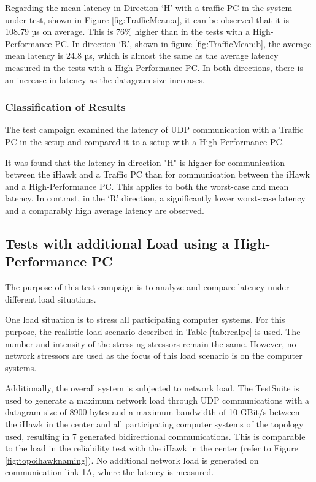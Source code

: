 Regarding the mean latency in Direction `H' with a traffic PC in the system under test, shown in Figure \ref{fig:TrafficMean:a}, it can be observed that it is 108.79 µs on average. This is 76\% higher than in the tests with a High-Performance PC. In direction `R', shown in figure \ref{fig:TrafficMean:b}, the average mean latency is 24.8 µs, which is almost the same as the average latency measured in the tests with a High-Performance PC. In both directions, there is an increase in latency as the datagram size increases.

\subsubsection{Classification of Results}
The test campaign examined the latency of UDP communication with a Traffic PC in the setup and compared it to a setup with a High-Performance PC.

It was found that the latency in direction "H" is higher for communication between the iHawk and a Traffic PC than for communication between the iHawk and a High-Performance PC. This applies to both the worst-case and mean latency. In contrast, in the `R' direction, a significantly lower worst-case latency and a comparably high average latency are observed.


\subsection{Tests with additional Load using a High-Performance PC}
The purpose of this test campaign is to analyze and compare latency under different load situations.

One load situation is to stress all participating computer systems. For this purpose, the realistic load scenario described in Table \ref{tab:realpc} is used. The number and intensity of the stress-ng stressors remain the same. However, no network stressors are used as the focus of this load scenario is on the computer systems.

Additionally, the overall system is subjected to network load. The TestSuite is used to generate a maximum network load through UDP communications with a datagram size of 8900 bytes and a maximum bandwidth of 10 GBit/s between the iHawk in the center and all participating computer systems of the topology used, resulting in 7 generated bidirectional communications. This is comparable to the load in the reliability test with the iHawk in the center (refer to Figure \ref{fig:topoihawknaming}). No additional network load is generated on communication link 1A, where the latency is measured.

